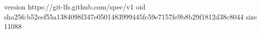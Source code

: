 version https://git-lfs.github.com/spec/v1
oid sha256:b52eef55a1384098f347e0501483999445fc59e7157fe9b8b29f1812d38c8044
size 11088
